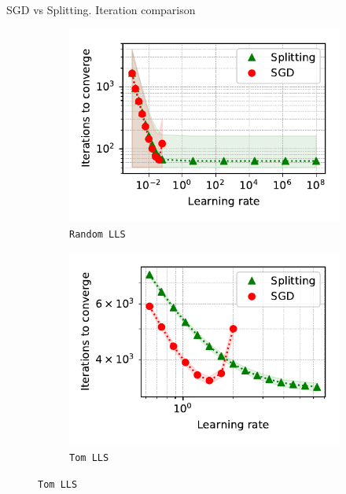 \documentclass[aspectratio=169]{beamer}
\begin{document}
\begin{frame}{SGD vs Splitting. Iteration comparison}
\begin{figure}
    \begin{subfigure}[b]{0.35\textwidth}
            \centering
            \includegraphics[width=\linewidth]{LLS_iter.pdf}
            \vspace{-25pt}
            \caption{{\small \texttt{Random LLS}}}
            \vspace{-22pt}
    \end{subfigure}%
    \begin{subfigure}[b]{0.35\textwidth}
            \centering
            \includegraphics[width=\linewidth]{LLS_tom_iter.pdf}
            \vspace{-25pt}
            \caption{{\small \texttt{Tom LLS}}}

\end{subfigure}
\end{figure}
\end{frame}
\end{document}
